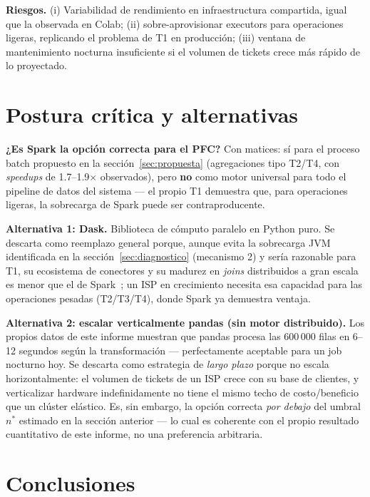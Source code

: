 \documentclass[11pt,a4paper]{article}
\begin{document}
\textbf{Riesgos.} (i) Variabilidad de rendimiento en infraestructura compartida,
igual que la observada en Colab; (ii) sobre-aprovisionar executors para
operaciones ligeras, replicando el problema de T1 en producción; (iii) ventana de
mantenimiento nocturna insuficiente si el volumen de tickets crece más rápido de
lo proyectado.

\section{Postura crítica y alternativas}

\textbf{¿Es Spark la opción correcta para el PFC?} Con matices: sí para el proceso
batch propuesto en la sección~\ref{sec:propuesta} (agregaciones tipo T2/T4, con
\textit{speedups} de 1.7--1.9$\times$ observados), pero \textbf{no} como motor
universal para todo el pipeline de datos del sistema --- el propio T1 demuestra
que, para operaciones ligeras, la sobrecarga de Spark puede ser contraproducente.

\textbf{Alternativa 1: Dask.} Biblioteca de cómputo paralelo en Python puro. Se
descarta como reemplazo general porque, aunque evita la sobrecarga JVM
identificada en la sección~\ref{sec:diagnostico} (mecanismo 2) y sería
razonable para T1, su ecosistema de conectores y su madurez en \textit{joins}
distribuidos a gran escala es menor que el de Spark~\cite{zaharia2016spark}; un
ISP en crecimiento necesita esa capacidad para las operaciones pesadas
(T2/T3/T4), donde Spark ya demuestra ventaja.

\textbf{Alternativa 2: escalar verticalmente pandas (sin motor distribuido).} Los
propios datos de este informe muestran que pandas procesa las 600\,000 filas en
6--12 segundos según la transformación --- perfectamente aceptable para un job
nocturno hoy. Se descarta como estrategia de \emph{largo plazo} porque no escala
horizontalmente: el volumen de tickets de un ISP crece con su base de clientes, y
verticalizar hardware indefinidamente no tiene el mismo techo de costo/beneficio
que un clúster elástico. Es, sin embargo, la opción correcta \emph{por debajo}
del umbral $n^*$ estimado en la sección anterior --- lo cual es coherente con el
propio resultado cuantitativo de este informe, no una preferencia arbitraria.

\section{Conclusiones}
\end{document}
